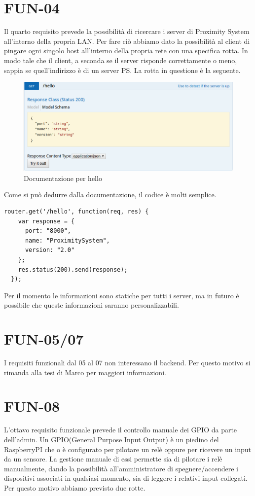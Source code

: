 \section{FUN-04}
Il quarto requisito prevede la possibilità di ricercare i server di Proximity System all'interno della propria LAN.
Per fare ciò abbiamo dato la possibilità al client di pingare ogni singolo host all'interno della propria rete con una specifica rotta.
In modo tale che il client, a seconda se il server risponde correttamente o meno, sappia se quell'indirizzo è di un server PS.
La rotta in questione è la seguente.
\begin{figure}[h]
\centering
\includegraphics[width=1\textwidth]{API/setting_hello.png} 
\caption{Documentazione per hello}
\label{fig:user:login}
\end{figure}
Come si può dedurre dalla documentazione, il codice è molti semplice.
\begin{lstlisting}[caption={/webserver/app/routes/setting.js hello}, style=javaScriptCode]
  router.get('/hello', function(req, res) {
    var response = {
      port: "8000",
      name: "ProximitySystem",
      version: "2.0"
    };
    res.status(200).send(response);
  });
\end{lstlisting}
Per il momento le informazioni sono statiche per tutti i server, ma in futuro è possibile che queste informazioni saranno personalizzabili.

\section{FUN-05/07}
I requisiti funzionali dal 05 al 07 non interessano il backend.
Per questo motivo si rimanda alla tesi di Marco per maggiori informazioni.
\section{FUN-08}
L'ottavo requisito funzionale prevede il controllo manuale dei GPIO da parte dell'admin.
Un GPIO(General Purpose Input Output) è un piedino del RaspberryPI che o è configurato per pilotare un relè oppure per ricevere un input da un sensore.
La gestione manuale di essi permette sia di pilotare i relè manualmente, dando la possibilità all'amministratore di spegnere/accendere i dispositivi associati in qualsiasi momento, sia di leggere i relativi input collegati.
Per questo motivo abbiamo previsto due rotte.

